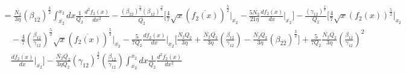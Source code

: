 \documentclass[fleqn, 10pt]{article}
\begin{document}
            \begin{equation*}
            \begin{split}
            &= \frac{\overline{N_2}}{3 \eta} (\beta_{1\overline{2}})^\frac{3}{2} \int^{x_2}_{\overline{x_2}} dx \frac{1}{Q_2} \frac{d^2f_2(x)}{dx^2} -  \frac{(\beta_{2\overline{2}})^\frac{3}{2} (\beta_{1\overline{2}})^\frac{3}{2}}{\overline{Q_2}} \Biggl[ \frac{4}{7} \sqrt{x} (\overline{f_2(x)})^\frac{5}{2} \Bigg|_{\overline{x_2}}  -   \frac{5 \overline{N_2}}{21 \eta} \frac{d\overline{f_2(x)}}{dx} \Bigg|_{\overline{x_2}} \Biggr] -   \frac{(\gamma_{12})^\frac{3}{2}}{Q_2} \Biggl[ \frac{4}{7} \sqrt{x} (f_2(x))^\frac{5}{2} \Bigg|_{x_2} \\ & \quad -   \frac{4}{7} \left(\frac{\beta_{1\overline{2}}}{\gamma_{12}}\right)^\frac{5}{2} \sqrt{x} (\overline{f_2(x)})^\frac{5}{2} \Bigg|_{\overline{x_2}} -  \frac{5}{7Q_2} \frac{df_2(x)}{dx} \Bigg|_{x_2} \Biggl[\frac{N_2Q_2}{3 \eta} + \frac{\overline{N_2} \overline{Q_2}}{3 \eta} \left(\frac{\beta_{1\overline{2}}}{\gamma_{12}}\right) - \frac{\overline{N_2} Q_2}{3 \eta} (\beta_{2\overline{2}})^\frac{3}{2} \Biggr] +  \frac{5}{7Q_2} \frac{\overline{N_2} \overline{Q_2}}{3 \eta} \left(\frac{\beta_{1\overline{2}}}{\gamma_{12}}\right)^2 \\ & \quad \frac{d\overline{f_2(x)}}{dx} \Bigg|_{\overline{x_2}} \Biggr]  - \frac{\overline{N_2} \overline{Q_2}}{3 \eta Q_2} (\gamma_{12})^\frac{3}{2} \left(\frac{\beta_{1\overline{2}}}{\gamma_{12}}\right) \int^{x_2}_{\overline{x_2}} dx \frac{1}{Q_2} \frac{d^2f_2(x)}{dx^2} 
            \end{split}
            \end{equation*}
\end{document}
